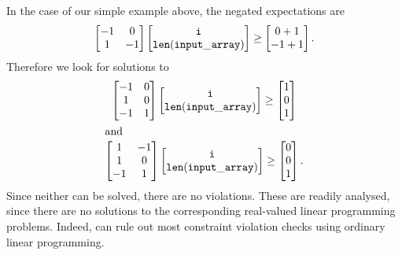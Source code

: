 \documentclass[10pt]{amsart}
\begin{document}
In the case of our simple example above, the negated expectations are
\begin{gather}
  \begin{bmatrix}
    -1 & 0 \\ 1 & -1
  \end{bmatrix}
  \begin{bmatrix}
    \mathtt{i} \\ \mathtt{len(input\_array)}
  \end{bmatrix}
  \geq
  \begin{bmatrix}
    0+1 \\ -1+1
  \end{bmatrix}
  \text{.}
\end{gather}
Therefore we look for solutions to
\begin{gather}
  \begin{bmatrix}
    -1 & 0 \\ 1 & 0 \\ -1 & 1
  \end{bmatrix}
  \begin{bmatrix}
    \mathtt{i} \\ \mathtt{len(input\_array)}
  \end{bmatrix}
  \geq
  \begin{bmatrix}
    1 \\ 0 \\ 1
  \end{bmatrix}
  \\\intertext{and}
  \begin{bmatrix}
    1 & -1 \\ 1 & 0 \\ -1 & 1
  \end{bmatrix}
  \begin{bmatrix}
    \mathtt{i} \\ \mathtt{len(input\_array)}
  \end{bmatrix}
  \geq
  \begin{bmatrix}
    0 \\ 0 \\ 1
  \end{bmatrix}
  \text{.}
\end{gather}
Since neither can be solved, there are no violations.  These are
readily analysed, since there are no solutions to the corresponding
real-valued linear programming problems.  Indeed, \Utop can rule out
most constraint violation checks using ordinary linear programming.
\end{document}
